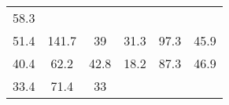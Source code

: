 \documentclass[10pt,]{article}
\begin{document}
\begin{longtable}[]{@{}cccccc@{}}
\begin{minipage}[t]{0.08\columnwidth}
58.3\strut
\end{minipage}\tabularnewline
\begin{minipage}[t]{0.16\columnwidth}\centering\strut
51.4\strut
\end{minipage} & \begin{minipage}[t]{0.16\columnwidth}\centering\strut
141.7\strut
\end{minipage} & \begin{minipage}[t]{0.16\columnwidth}\centering\strut
39\strut
\end{minipage} & \begin{minipage}[t]{0.16\columnwidth}\centering\strut
31.3\strut
\end{minipage} & \begin{minipage}[t]{0.09\columnwidth}\centering\strut
97.3\strut
\end{minipage} & \begin{minipage}[t]{0.08\columnwidth}\centering\strut
45.9\strut
\end{minipage}\tabularnewline
\begin{minipage}[t]{0.16\columnwidth}\centering\strut
40.4\strut
\end{minipage} & \begin{minipage}[t]{0.16\columnwidth}\centering\strut
62.2\strut
\end{minipage} & \begin{minipage}[t]{0.16\columnwidth}\centering\strut
42.8\strut
\end{minipage} & \begin{minipage}[t]{0.16\columnwidth}\centering\strut
18.2\strut
\end{minipage} & \begin{minipage}[t]{0.09\columnwidth}\centering\strut
87.3\strut
\end{minipage} & \begin{minipage}[t]{0.08\columnwidth}\centering\strut
46.9\strut
\end{minipage}\tabularnewline
\begin{minipage}[t]{0.16\columnwidth}\centering\strut
33.4\strut
\end{minipage} & \begin{minipage}[t]{0.16\columnwidth}\centering\strut
71.4\strut
\end{minipage} & \begin{minipage}[t]{0.16\columnwidth}\centering\strut
33\strut
\end{minipage} & \begin{minipage}[t]{0.16\columnwidth}\centering\strut

\end{minipage}
\end{longtable}
\end{document}
